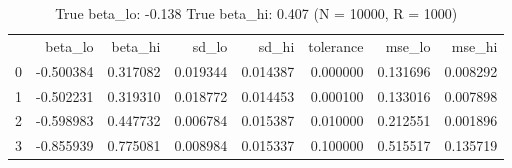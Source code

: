 \begin{table}
\caption{True beta_lo: -0.138 True beta_hi: 0.407 (N = 10000, R = 1000)}
\begin{tabular}{lrrrrrrr}
 & beta_lo & beta_hi & sd_lo & sd_hi & tolerance & mse_lo & mse_hi \\
0 & -0.500384 & 0.317082 & 0.019344 & 0.014387 & 0.000000 & 0.131696 & 0.008292 \\
1 & -0.502231 & 0.319310 & 0.018772 & 0.014453 & 0.000100 & 0.133016 & 0.007898 \\
2 & -0.598983 & 0.447732 & 0.006784 & 0.015387 & 0.010000 & 0.212551 & 0.001896 \\
3 & -0.855939 & 0.775081 & 0.008984 & 0.015337 & 0.100000 & 0.515517 & 0.135719 \\
\end{tabular}
\end{table}

